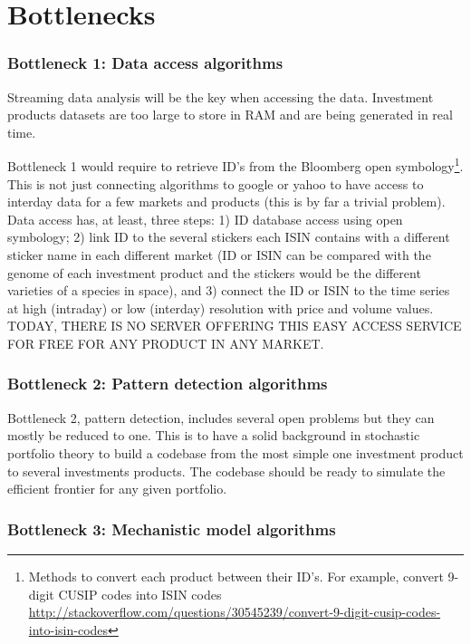 \documentclass[english,12pt]{article}
\begin{document}
\section{Bottlenecks}

\subsubsection{Bottleneck 1: Data access algorithms}

Streaming data analysis will be the key when accessing the data. Investment products datasets are too large to store in RAM and are being generated in real time. 


Bottleneck 1 would require to retrieve ID's from the Bloomberg open symbology\footnote{Methods to convert each product between their ID's. For example, convert 9-digit CUSIP codes into ISIN codes \url{http://stackoverflow.com/questions/30545239/convert-9-digit-cusip-codes-into-isin-codes}}. This is not just connecting algorithms to google or yahoo to have access to interday data for a few markets and products (this is by far a trivial problem). Data access has, at least, three steps: 1) ID database access using open symbology; 2) link ID to the several stickers each ISIN contains with a different sticker name in each different market (ID or ISIN can be
compared with the genome of each investment product and the stickers would be the different varieties of a species in space), and 3) connect the ID or ISIN to the time series at high (intraday) or low
(interday) resolution with price and volume values. TODAY, THERE IS NO SERVER OFFERING THIS EASY ACCESS SERVICE FOR FREE FOR ANY PRODUCT IN ANY MARKET.

\subsubsection{Bottleneck 2: Pattern detection algorithms}

Bottleneck 2, pattern detection, includes several open problems but
they can mostly be reduced to one. This is to have a solid background
in stochastic portfolio theory  to build a codebase 
from the most simple one investment product to several investments
products. The codebase should be ready to simulate the efficient
frontier for any given portfolio.

\subsubsection{Bottleneck 3: Mechanistic model algorithms}
\end{document}
